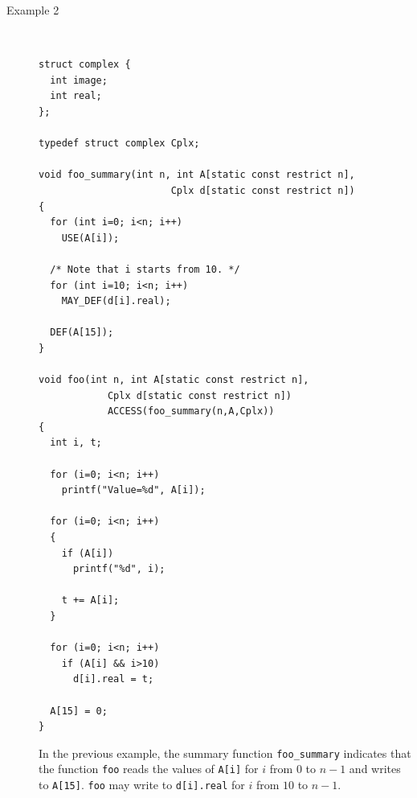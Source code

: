 \documentclass{carp}
\begin{document}
\begin{description}
  
  \item[Example 2]~
  \begin{lstlisting}[language=pencil]
struct complex {
  int image;
  int real;
};

typedef struct complex Cplx;

void foo_summary(int n, int A[static const restrict n],
                       Cplx d[static const restrict n])
{
  for (int i=0; i<n; i++)
    USE(A[i]);

  /* Note that i starts from 10. */
  for (int i=10; i<n; i++)
    MAY_DEF(d[i].real);

  DEF(A[15]);
}

void foo(int n, int A[static const restrict n],
            Cplx d[static const restrict n])
            ACCESS(foo_summary(n,A,Cplx))
{
  int i, t;

  for (i=0; i<n; i++)
    printf("Value=%d", A[i]);

  for (i=0; i<n; i++)
  {
    if (A[i])
      printf("%d", i);

    t += A[i];
  }

  for (i=0; i<n; i++)
    if (A[i] && i>10)
      d[i].real = t;

  A[15] = 0;
}
  \end{lstlisting}

  In the previous example, the summary function
  \lstinline!foo_summary!  indicates that the function
  \lstinline!foo! reads the values of \lstinline!A[i]!  for $i$
  from $0$ to $n-1$ and writes to \lstinline!A[15]!.
  \lstinline!foo! may write to \lstinline!d[i].real! for $i$
  from $10$ to $n-1$. 
\end{description}
\end{document}
